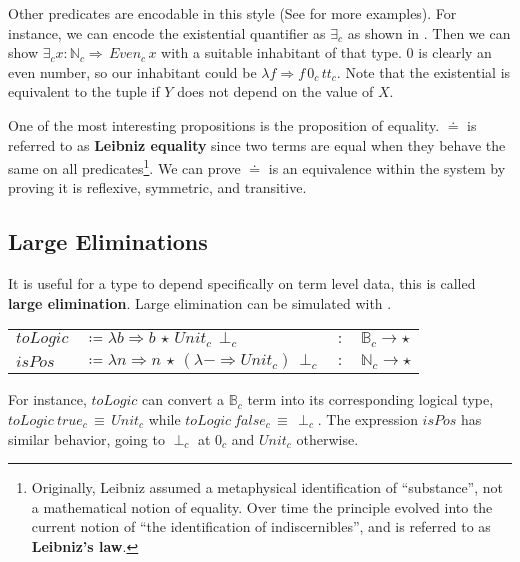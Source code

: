 Other predicates are encodable in this style (See \cite{Martin-Lof-1971,cardelli1986polymorphic,10.1016/0890-5401(88)90005-3} for more examples).
For instance, we can encode the existential quantifier as $\exists_{c}$ as shown in .
Then we can show $\exists_{c}x:\mathbb{N}_{c}\Rightarrow\,Even_{c}\,x$ with a suitable inhabitant of that type.
$0$ is clearly an even number, so our inhabitant could be $\lambda f\Rightarrow f\,0_{c}\,tt_{c}$.
Note that the existential is equivalent to the tuple if $Y$ does not depend on the value of $X$.

One of the most interesting propositions is the proposition of equality.
$\doteq$ is referred to as \textbf{Leibniz equality} since two terms are equal when they behave the same on all predicates\footnote{
  Originally, Leibniz assumed a metaphysical identification of ``substance'', not a mathematical notion of equality\cite[Section 9]{Leibniz1686}.
  Over time the principle evolved into the current notion of ``the identification of indiscernibles'', and is referred to as \textbf{Leibniz's law}.}.
We can prove $\doteq$ is an equivalence within the system by proving it is reflexive, symmetric, and transitive.

\subsection{Large Eliminations}


It is useful for a type to depend specifically on term level data, this is called \textbf{large elimination}.
Large elimination can be simulated with \tit{}.

\begin{tabular}{llll}
  $toLogic$ & $\coloneqq\lambda b\Rightarrow b\,\star\,Unit_{c}\,\perp_{c}$ & $:$ & $\mathbb{B}_{c}\rightarrow\star$\tabularnewline
  $isPos$ & $\coloneqq\lambda n\Rightarrow n\,\star\,(\lambda-\Rightarrow Unit_{c})\,\perp_{c}$ & $:$ & $\mathbb{N}_{c}\rightarrow\star$\tabularnewline
\end{tabular}
  
For instance, $toLogic$ can convert a $\mathbb{B}_{c}$ term into its corresponding logical type, $toLogic\ true_{c}\,\equiv\, Unit_{c}$ while $toLogic\ false_{c}\, \equiv\, \perp_{c}$.
The expression $isPos$ has similar behavior, going to $\perp_{c}$ at $0_{c}$ and $Unit_{c}$ otherwise.

